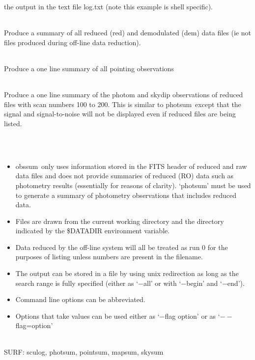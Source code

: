 \documentclass[twoside,11pt]{article}
\newcommand{\task}[1]{{\sf #1}}
\newcommand{\sculog}{\htmlref{\task{sculog}}{SCULOG}}
\newcommand{\photsum}{\htmlref{\task{photsum}}{PHOTSUM}}
\newcommand{\mapsum}{\htmlref{\task{mapsum}}{MAPSUM}}
\newcommand{\skysum}{\htmlref{\task{skysum}}{SKYSUM}}
\newcommand{\pointsum}{\htmlref{\task{pointsum}}{POINTSUM}}
\newcommand{\obssum}{\htmlref{\task{obssum}}{OBSSUM}}
\newcommand{\htmlref}[2]{#1}
\renewcommand{\_}{\texttt{\symbol{95}}}
\newlength{\sstexampleslength}
\newcommand{\sstexamplesubsection}[2]{\sloppy
\item[\parbox{\sstexampleslength}{\ssttt #1}] \mbox{} \vspace{1.0ex}
\\ #2 }
\newcommand{\sstnotes}[1]{\item[Notes:] \mbox{} \\[1.3ex] #1}
\newcommand{\sstdiytopic}[2]{\item[{\hspace{-0.35em}#1\hspace{-0.35em}:}]
\mbox{} \\[1.3ex] #2}
\newcommand{\sstitemlist}[1]{
  \mbox{} \\
  \vspace{-3.5ex}
  \begin{itemize}
     #1
  \end{itemize}
}
\newcommand{\sstitem}{\item}
\newcommand{\sstexamplesubsection}[2]{\item[{\ssttt #1}] #2}
\newcommand{\sstnotes}[1]{\item[Notes:] #1 }
\newcommand{\sstdiytopic}[2]{\item[{#1}] #2 }
\newcommand{\sstitemlist}[1]{
      \begin{itemize}
         #1
      \end{itemize}
      \\
   }
\newcommand{\sstitem}{\item}
\begin{document}
{{{         the output in the text file log.txt (note this example is
         shell specific).
      }
      \sstexamplesubsection{
         obssum $-$all $-$reduced $-$demod
      }{
         Produce a summary of all reduced (\_red\_) and demodulated (\_dem\_)
         data files (ie not files produced during off-line data reduction).
      }
      \sstexamplesubsection{
         obssum $-$all $-$mode pointing
      }{
         Produce a one line summary of all pointing observations
      }
      \sstexamplesubsection{
         obssum $-$reduced $-$begin 100 $-$end 200 $--$mode=photom,skydip
      }{
         Produce a one line summary of the photom and skydip observations
         of reduced files with scan numbers 100 to 200. This is similar to
         \photsum\ except that the signal and signal-to-noise will not be
         displayed even if reduced files are being listed.
      }
   }
   \sstnotes{
      \sstitemlist{

         \sstitem
         \obssum\ only uses information stored in the FITS header of
           reduced and raw data files and does not  provide summaries
           of reduced (RO) data such as photometry results (essentially for
           reasons of clarity). `\photsum' must
           be used to generate a summary of photometry observations that
           includes reduced data.

         \sstitem
         Files are drawn from the current working directory and the directory
           indicated by the \$DATADIR environment variable.  %

         \sstitem
         Data reduced by the off-line system will all be treated as
           run 0 for the purposes of listing unless numbers are present
           in the filename.

         \sstitem
         The output can be stored in a file by using unix redirection as
           long as the search range is fully specified (either as `$-$all' or
           with `$-$begin' and `$-$end').

         \sstitem
         Command line options can be abbreviated.

         \sstitem
         Options that take values can be used either as `$-$flag option' or
         as `$--$flag=option'
      }
   }
   \sstdiytopic{
      Related Applications
   }{
      SURF: \sculog, \photsum, \pointsum, \mapsum, \skysum
   }
}
\end{document}
